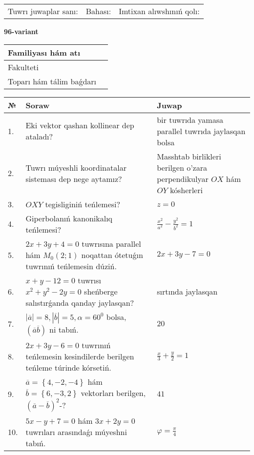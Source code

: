 \documentclass{article}
\begin{document}
\vspace{1cm}

\begin{tabular}{lll}
Tuwrı juwaplar sanı: \underline{\hspace{1.5cm}} & 
Bahası: \underline{\hspace{1.5cm}} & 
Imtixan alıwshınıń qolı: \underline{\hspace{2cm}} \\
\end{tabular}

\egroup

\newpage


\textbf{96-variant}\\

\bgroup
\def\arraystretch{1.6} %

\begin{tabular}{|m{5.7cm}|m{9.5cm}|}
\hline
Familiyası hám atı & \\
\hline
Fakulteti  & \\
\hline
Toparı hám tálim baǵdarı  & \\
\hline
\end{tabular}

\vspace{1cm}

\begin{tabular}{|m{0.7cm}|m{10cm}|m{4cm}|}
\hline
№ & Soraw & Juwap \\
\hline
1. & Eki vektor qashan kollinear dep ataladı? & bir tuwrıda yamasa parallel tuwrıda jaylasqan bolsa \\
\hline
2. & Tuwrı múyeshli koordinatalar sisteması dep nege aytamız? & Masshtab birlikleri berilgen o'zara perpendikulyar $OX$ hám $OY$ kósherleri \\
\hline
3. & $OXY$ tegisliginiń teńlemesi? & $z=0$ \\
\hline
4. & Giperbolanıń kanonikalıq teńlemesi? & $\frac{x^2}{a^2}-\frac{y^2}{b^2}=1$ \\
\hline
5. & $2x+3y+4=0$ tuwrısına parallel hám $M_{0} (2;1)$ noqattan ótetuǵın tuwrınıń teńlemesin dúziń. & $2x+3y-7=0$ \\
\hline
6. & $x+y-12=0$ tuwrısı $x^{2}+y^{2}-2y=0$ sheńberge salıstırǵanda qanday jaylasqan? & sırtında jaylasqan \\
\hline
7. & $\left| \overline{a} \right|=8, \left| \overline{b} \right|=5, \alpha=60^{0}$ bolsa, $( \overline{a}\overline{b} )$ ni tabıń. & $20$ \\
\hline
8. & $2x+3y-6=0$ tuwrınıń teńlemesin kesindilerde berilgen teńleme túrinde kórsetiń. & $\frac{x}{3} + \frac{ y }{ 2 } =  1$ \\
\hline
9. & $\overline{a}=\left\{ 4,-2,-4 \right\}$ hám $\overline{b}=\left\{ 6,-3, 2 \right\}$ vektorları berilgen, $(\overline{a}-\overline{b}) ^{2}$-? & $41$ \\
\hline
10. & $5x-y+7=0$ hám $3x+2y=0$ tuwrıları arasındaǵı múyeshni tabıń. & $\varphi=\frac{\pi}{4}$ \\
\hline
\end{tabular}
\end{document}
